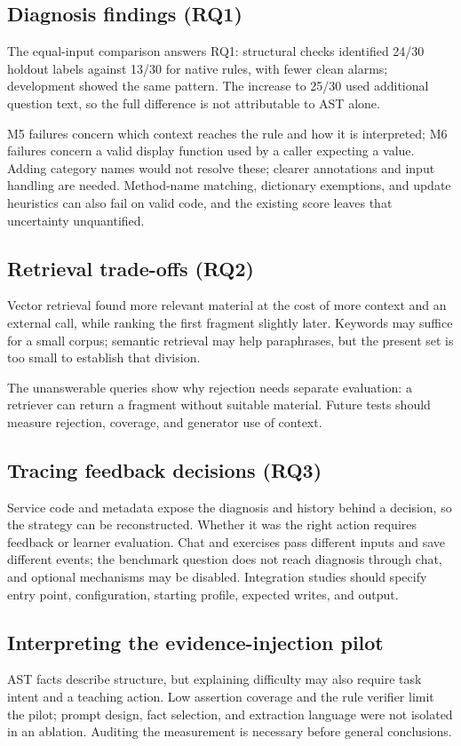 \subsection{Diagnosis findings (RQ1)}
The equal-input comparison answers RQ1: structural checks identified 24/30 holdout labels against 13/30 for native rules, with fewer clean alarms; development showed the same pattern. The increase to 25/30 used additional question text, so the full difference is not attributable to AST alone.

M5 failures concern which context reaches the rule and how it is interpreted; M6 failures concern a valid display function used by a caller expecting a value. Adding category names would not resolve these; clearer annotations and input handling are needed. Method-name matching, dictionary exemptions, and update heuristics can also fail on valid code, and the existing score leaves that uncertainty unquantified.

\subsection{Retrieval trade-offs (RQ2)}
Vector retrieval found more relevant material at the cost of more context and an external call, while ranking the first fragment slightly later. Keywords may suffice for a small corpus; semantic retrieval may help paraphrases, but the present set is too small to establish that division.

The unanswerable queries show why rejection needs separate evaluation: a retriever can return a fragment without suitable material. Future tests should measure rejection, coverage, and generator use of context.

\subsection{Tracing feedback decisions (RQ3)}
Service code and metadata expose the diagnosis and history behind a decision, so the strategy can be reconstructed. Whether it was the right action requires feedback or learner evaluation. Chat and exercises pass different inputs and save different events; the benchmark question does not reach diagnosis through chat, and optional mechanisms may be disabled. Integration studies should specify entry point, configuration, starting profile, expected writes, and output.

\subsection{Interpreting the evidence-injection pilot}
AST facts describe structure, but explaining difficulty may also require task intent and a teaching action. Low assertion coverage and the rule verifier limit the pilot; prompt design, fact selection, and extraction language were not isolated in an ablation. Auditing the measurement is necessary before general conclusions.

